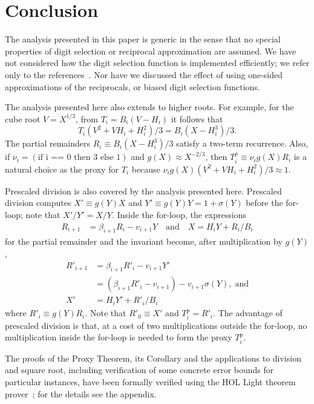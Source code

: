 \documentclass[10pt]{article}
\theoremstyle{definition}
\theoremstyle{remark}
\numberwithin{equation}{section}
\begin{document}
\section{Conclusion\label{sec:conclusion}}

The analysis presented in this paper is generic in the sense that no special properties of digit selection or reciprocal approximation are assumed.
We have not considered how the digit selection function is implemented efficiently; we refer only to the references~\cite{daumas1997recoders, daumas2003further, ercegovac1994recoding,  ercegovac1994very, lang1995very}. 
Nor have we discussed the effect of using one-sided approximations of the reciprocals, or biased digit selection functions. 

The analysis presented here also extends to higher roots. 
For example, for the cube root $V = X^{1/3}$, from $T_i = B_i(V - H_i)$ it follows that 
\[
T_i (V^2 + VH_i + H_i^2)/3 = B_i(X - H_i^3)/3 .
\]
The partial remainders $R_i \equiv B_i(X - H_i^3)/3$ satisfy a two-term recurrence. 
Also, if $\nu_i = (\text{if i == 0 then 3 else 1})$ and $g(X) \approx X^{-2/3}$, then $T_i^p \equiv \nu_i g(X) R_i$ is a natural choice as the proxy for $T_i$ because $\nu_ig(X)(V^2 + VH_i + H_i^2)/3 \approx 1$.

Prescaled division is also covered by the analysis presented here. 
Prescaled division computes $X' \equiv g(Y) X$ and $Y' \equiv g(Y ) Y = 1 + \sigma(Y)$ before the for-loop; note that $X'/Y' = X/Y$.
Inside the for-loop, the expressions
\begin{align*}
R_{i+1} &= \beta_{i+1} R_i - v_{i+1} Y  \quad\text{and}\quad
X = H_i Y + R_i/B_i
\end{align*}
for the partial remainder and the invariant become, after multiplication by $g(Y)$,
\begin{align*}
R'_{i+1} &= \beta_{i+1} R'_i - v_{i+1}  Y' \\
&= (\beta_{i+1} R'_i - v_{i+1}) - v_{i+1} \sigma(Y), \;\text{and} \\
X' &= H_i Y' + R'_i/B_i
\end{align*}
where $R'_i \equiv g(Y) R_i$. Note that $R'_0 \equiv X'$ and $T^p_i = R'_i$. The advantage of prescaled division is that, at a cost of two multiplications outside the for-loop, no multiplication inside the for-loop is needed to form the proxy $T^p_i$.  

The proofs of the Proxy Theorem, its Corollary and the applications to division and square root, including verification of some concrete error bounds for particular instances, have been formally verified using the HOL Light theorem prover~\cite{harrison1996hol}; for the details see the appendix.
\end{document}
